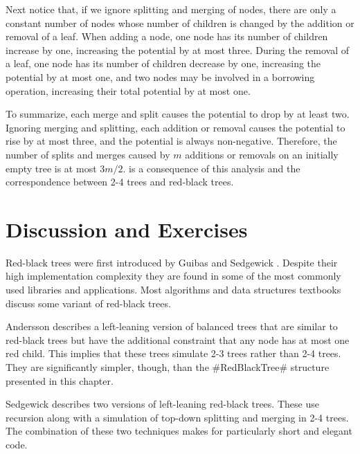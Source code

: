 Next notice that, if we ignore splitting and merging of nodes, there are
only a constant number of nodes whose number of children is changed by
the addition or removal of a leaf.  When adding a node, one node has
its number of children increase by one, increasing the potential by
at most three.  During the removal of a leaf, one node has its number
of children decrease by one, increasing the potential by at most one,
and two nodes may be involved in a borrowing operation, increasing their
total potential by at most one.

To summarize, each merge and split causes the potential to drop by
at least two.  Ignoring merging and splitting, each addition or removal
causes the potential to rise by at most three, and the potential is always
non-negative.  Therefore, the number of splits and merges caused by $m$
additions or removals on an initially empty tree is at most $3m/2$.
 is a consequence of this analysis and the
correspondence between 2-4 trees and red-black trees.

\section{Discussion and Exercises}

Red-black trees were first introduced by Guibas and Sedgewick \cite{gs78}.
Despite their high implementation complexity they are found in some of
the most commonly used libraries and applications.  Most algorithms and
data structures textbooks discuss some variant of red-black trees.

Andersson \cite{a93} describes a left-leaning version of balanced trees
that are similar to red-black trees but have the additional constraint
that any node has at most one red child.  This implies that these trees
simulate 2-3 trees rather than 2-4 trees.  They are significantly simpler,
though, than the #RedBlackTree# structure presented in this chapter.

Sedgewick \cite{s08} describes two versions of left-leaning red-black
trees.  These use recursion along with a simulation of top-down splitting
and merging in 2-4 trees. The combination of these two techniques makes
for particularly short and elegant code.

